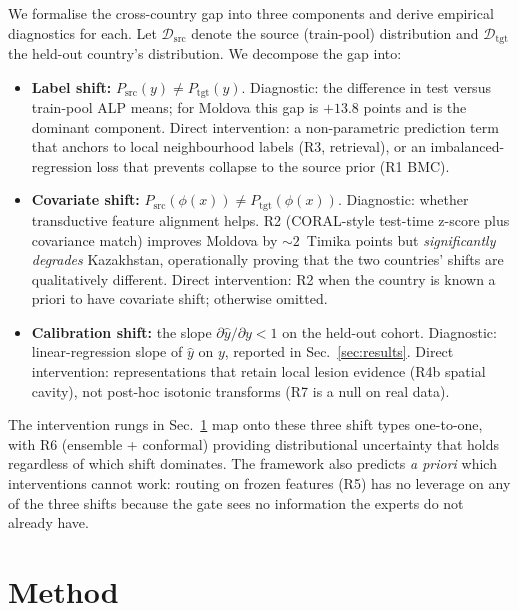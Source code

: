 \documentclass[runningheads]{llncs}
\begin{document}
We formalise the cross-country gap into three components and derive empirical diagnostics for each. Let $\mathcal{D}_{\text{src}}$ denote the source (train-pool) distribution and $\mathcal{D}_{\text{tgt}}$ the held-out country's distribution. We decompose the gap into:
\begin{itemize}
\item \textbf{Label shift:} $P_{\text{src}}(y) \neq P_{\text{tgt}}(y)$. Diagnostic: the difference in test versus train-pool ALP means; for Moldova this gap is $+13.8$ points and is the dominant component. Direct intervention: a non-parametric prediction term that anchors to local neighbourhood labels (R3, retrieval), or an imbalanced-regression loss that prevents collapse to the source prior (R1 BMC).
\item \textbf{Covariate shift:} $P_{\text{src}}(\phi(x)) \neq P_{\text{tgt}}(\phi(x))$. Diagnostic: whether transductive feature alignment helps. R2 (CORAL-style test-time z-score plus covariance match) improves Moldova by $\sim 2$~Timika points but \emph{significantly degrades} Kazakhstan, operationally proving that the two countries' shifts are qualitatively different. Direct intervention: R2 when the country is known a priori to have covariate shift; otherwise omitted.
\item \textbf{Calibration shift:} the slope $\partial \hat{y}/\partial y < 1$ on the held-out cohort. Diagnostic: linear-regression slope of $\hat{y}$ on $y$, reported in Sec.~\ref{sec:results}. Direct intervention: representations that retain local lesion evidence (R4b spatial cavity), not post-hoc isotonic transforms (R7 is a null on real data).
\end{itemize}
The intervention rungs in Sec.~\ref{sec:method} map onto these three shift types one-to-one, with R6 (ensemble + conformal) providing distributional uncertainty that holds regardless of which shift dominates. The framework also predicts \emph{a priori} which interventions cannot work: routing on frozen features (R5) has no leverage on any of the three shifts because the gate sees no information the experts do not already have.

\section{Method}
\label{sec:method}
\end{document}

